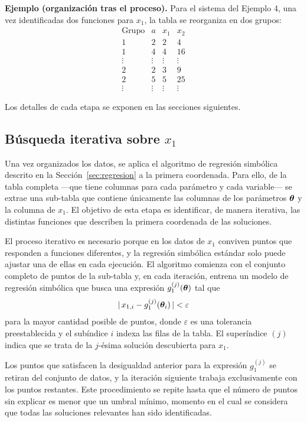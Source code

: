 \bigskip \noindent\textbf{Ejemplo (organización tras el proceso).} Para el sistema del Ejemplo 4, una vez identificadas dos funciones para \(x_1\), la tabla se reorganiza en dos grupos: \[ \begin{array}{c|c|c|c}
\text{Grupo} & a & x_1 & x_2 \\
\hline
1 & 2 & 2 & 4 \\
1 & 4 & 4 & 16 \\
\vdots & \vdots & \vdots & \vdots \\[4pt]
2 & 2 & 3 & 9 \\
2 & 5 & 5 & 25 \\
\vdots & \vdots & \vdots & \vdots \end{array} \]

Los detalles de cada etapa se exponen en las secciones siguientes.

\subsection{Búsqueda iterativa sobre \(x_1\)} \label{sec:busqueda_ancla}

Una vez organizados los datos, se aplica el algoritmo de regresión simbólica descrito en la Sección~\ref{sec:regresion} a la primera coordenada. Para ello, de la tabla completa —que tiene columnas para cada parámetro y cada variable— se extrae una sub-tabla que contiene únicamente las columnas de los parámetros \(\boldsymbol{\theta}\) y la columna de \(x_1\). El objetivo de esta etapa es identificar, de manera iterativa, las distintas funciones que describen la primera coordenada de las soluciones.

El proceso iterativo es necesario porque en los datos de \(x_1\) conviven puntos que responden a funciones diferentes, y la regresión simbólica estándar solo puede ajustar una de ellas en cada ejecución. El algoritmo comienza con el conjunto completo de puntos de la sub-tabla y, en cada iteración, entrena un modelo de regresión simbólica que busca una expresión \(g_1^{(j)}(\boldsymbol{\theta})\) tal que \[ |\,x_{1,i} - g_1^{(j)}(\boldsymbol{\theta}_i)\,| < \varepsilon \] para la mayor cantidad posible de puntos, donde \(\varepsilon\) es una tolerancia preestablecida y el subíndice \(i\) indexa las filas de la tabla. El superíndice \((j)\) indica que se trata de la \(j\)-ésima solución descubierta para \(x_1\).

Los puntos que satisfacen la desigualdad anterior para la expresión \(g_1^{(j)}\) se retiran del conjunto de datos, y la iteración siguiente trabaja exclusivamente con los puntos restantes. Este procedimiento se repite hasta que el número de puntos sin explicar es menor que un umbral mínimo, momento en el cual se considera que todas las soluciones relevantes han sido identificadas.

